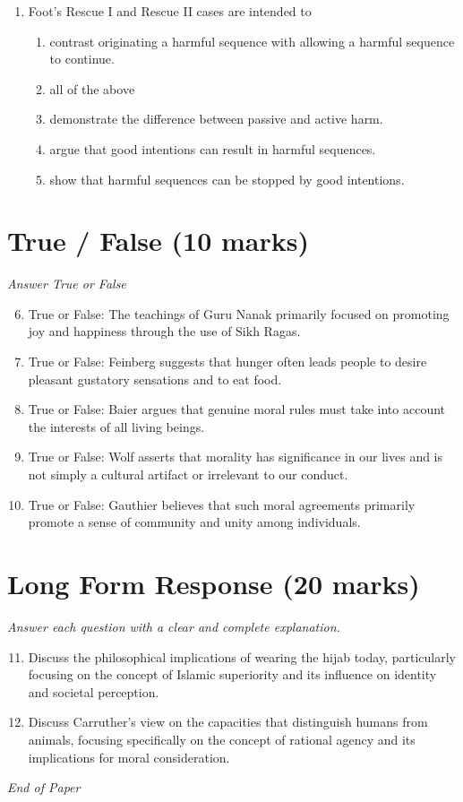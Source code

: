 \documentclass[12pt]{article}
\begin{document}
\begin{enumerate}[label=\arabic*.]
\begin{enumerate}[label=(\alph*)]
    \item Fifth century BCE
    \item Second century CE
\end{enumerate}
\item Foot's Rescue I and Rescue II cases are intended to
\begin{enumerate}[label=(\alph*)]
    \item contrast originating a harmful sequence with allowing a harmful sequence to continue.
    \item all of the above
    \item demonstrate the difference between passive and active harm.
    \item argue that good intentions can result in harmful sequences.
    \item show that harmful sequences can be stopped by good intentions.
\end{enumerate}
\end{enumerate}

\section*{True / False (10 marks)}
\textit{Answer True or False}
\begin{enumerate}[label=\arabic*.]
\setcounter{enumi}{5}
\item True or False: The teachings of Guru Nanak primarily focused on promoting joy and happiness through the use of Sikh Ragas.
\item True or False: Feinberg suggests that hunger often leads people to desire pleasant gustatory sensations and to eat food.
\item True or False: Baier argues that genuine moral rules must take into account the interests of all living beings.
\item True or False: Wolf asserts that morality has significance in our lives and is not simply a cultural artifact or irrelevant to our conduct.
\item True or False: Gauthier believes that such moral agreements primarily promote a sense of community and unity among individuals.
\end{enumerate}

\section*{Long Form Response (20 marks)}
\textit{Answer each question with a clear and complete explanation.}
\begin{enumerate}[label=\arabic*.]
\setcounter{enumi}{10}
\item Discuss the philosophical implications of wearing the hijab today, particularly focusing on the concept of Islamic superiority and its influence on identity and societal perception.
\item Discuss Carruther's view on the capacities that distinguish humans from animals, focusing specifically on the concept of rational agency and its implications for moral consideration.
\end{enumerate}

\vfill
\noindent\textit{End of Paper}
\end{document}

